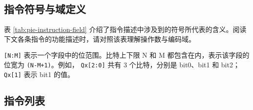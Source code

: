 \documentclass[main\_\_CN.tex]{subfiles}
\begin{document}
\subsection{指令符号与域定义}

表 \ref{tab:pie-instruction-field} 介绍了指令描述中涉及到的符号所代表的含义。阅读下文各条指令的功能描述时，请对照该表理解操作数与编码域。

\texttt{[N:M]} 表示一个字段中的位范围。比特上下限 N 和 M 都包含在内，表示该字段的位宽为 \texttt{(N-M+1)}。例如， \texttt{Qx[2:0]} 共有 3 个比特，分别是 bit0、bit1 和 bit2；\texttt{Qx[1]} 表示 bit1 的值。



\subsection{指令列表}

\setcounter{tocdepth}{1}%
%
\captionsetup{list=false}%
\hypersetup{bookmarksdepth=1}%



\captionsetup{list=true}%
\hypersetup{bookmarksdepth=4}%
\setcounter{tocdepth}{4}%
%
\end{document}
